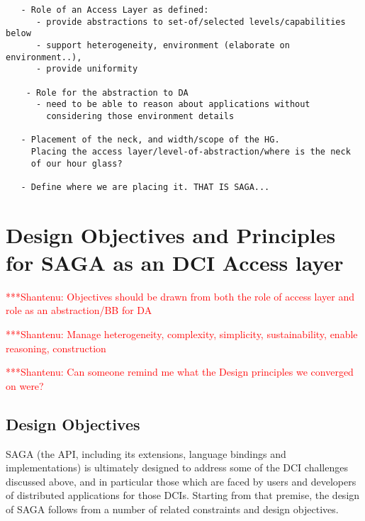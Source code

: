 \documentclass[a4paper,12pt]{article}
\newcommand{\jhanote}[1]{  {\textcolor{red}  { ***Shantenu: #1 }}}
\newcommand{\jhanote}[1]{}
\begin{document}
\begin{verbatim}
   - Role of an Access Layer as defined:
      - provide abstractions to set-of/selected levels/capabilities below
      - support heterogeneity, environment (elaborate on environment..), 
      - provide uniformity

    - Role for the abstraction to DA 
      - need to be able to reason about applications without 
        considering those environment details

   - Placement of the neck, and width/scope of the HG.
     Placing the access layer/level-of-abstraction/where is the neck
     of our hour glass?

   - Define where we are placing it. THAT IS SAGA...
\end{verbatim}

% 
\section{Design Objectives and Principles for SAGA as an DCI Access layer}
\label{sec:designobjectives}


 \jhanote{Objectives should be drawn from both the role of access
   layer and role as an abstraction/BB for DA}

 \jhanote{Manage heterogeneity, complexity, simplicity,
   sustainability, enable reasoning, construction}

 \jhanote{Can someone remind me what the Design principles we
   converged on were?}

 \subsection{Design Objectives}


  SAGA (the API, including its extensions, language bindings and
  implementations) is ultimately designed to address some of the DCI
  challenges discussed above, and in particular those which are faced
  by users and developers of distributed applications for those DCIs.
  Starting from that premise, the design of SAGA follows from a number
  of related constraints and design objectives.
\end{document}
